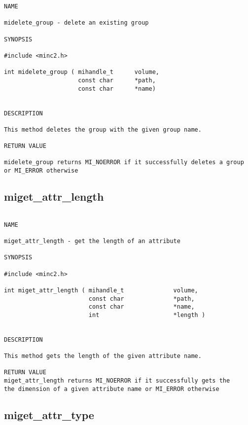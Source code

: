 \documentclass{article}
\begin{document}
\begin{verbatim}
NAME 

midelete_group - delete an existing group

SYNOPSIS

#include <minc2.h>

int midelete_group ( mihandle_t      volume,
                     const char      *path,
                     const char      *name)    
                       
                                
DESCRIPTION

This method deletes the group with the given group name.

RETURN VALUE

midelete_group returns MI_NOERROR if it successfully deletes a group 
or MI_ERROR otherwise

\end{verbatim}

\subsection{miget\_attr\_length}

\begin{verbatim}

NAME 

miget_attr_length - get the length of an attribute

SYNOPSIS

#include <minc2.h>

int miget_attr_length ( mihandle_t              volume,
                        const char              *path,
                        const char              *name,
                        int                     *length ) 
               
                                
DESCRIPTION

This method gets the length of the given attribute name.

RETURN VALUE
miget_attr_length returns MI_NOERROR if it successfully gets the
the dimension of a given attribute name or MI_ERROR otherwise
\end{verbatim}

\subsection{miget\_attr\_type}
\end{document}
